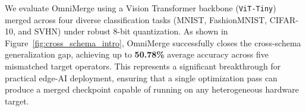 We evaluate OmniMerge using a Vision Transformer backbone (\texttt{ViT-Tiny})~\cite{dosovitskiy20vit} merged across four diverse classification tasks (MNIST, FashionMNIST, CIFAR-10, and SVHN) under robust 8-bit quantization. As shown in Figure~\ref{fig:cross_schema_intro}, OmniMerge successfully closes the cross-schema generalization gap, achieving up to \textbf{50.78\%} average accuracy across five mismatched target operators. This represents a significant breakthrough for practical edge-AI deployment, ensuring that a single optimization pass can produce a merged checkpoint capable of running on any heterogeneous hardware target.
